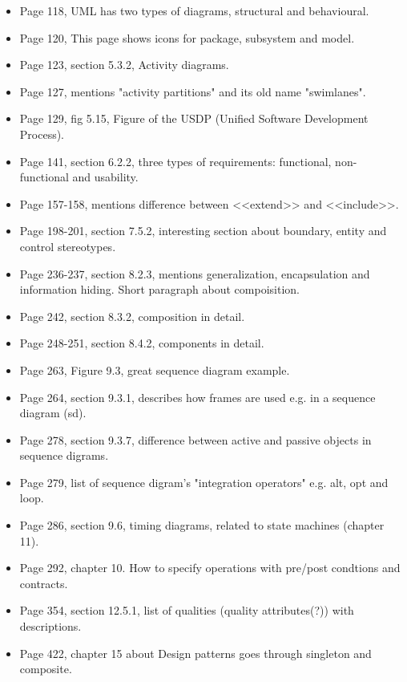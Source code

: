 \begin{itemize}
    \item Page 118, UML has two types of diagrams, structural and behavioural.
    \item Page 120, This page shows icons for package, subsystem and model.
    \item Page 123, section 5.3.2, Activity diagrams.
    \item Page 127, mentions "activity partitions" and its old name
        "swimlanes".
    \item Page 129, fig 5.15, Figure of the USDP (Unified Software Development
        Process).
    \item Page 141, section 6.2.2, three types of requirements: functional,
        non-functional and usability.
    \item Page 157-158, mentions difference between <<extend>> and <<include>>.
    \item Page 198-201, section 7.5.2, interesting section about boundary,
        entity and control stereotypes.
    \item Page 236-237, section 8.2.3, mentions generalization, encapsulation
        and information hiding. Short paragraph about compoisition.
    \item Page 242, section 8.3.2, composition in detail.
    \item Page 248-251, section 8.4.2, components in detail.
    \item Page 263, Figure 9.3, great sequence diagram example.
    \item Page 264, section 9.3.1, describes how frames are used e.g. in a
        sequence diagram (sd).
    \item Page 278, section 9.3.7, difference between active and passive
        objects in sequence digrams.
    \item Page 279, list of sequence digram's "integration operators" e.g. alt,
        opt and loop.
    \item Page 286, section 9.6, timing diagrams, related to state machines
        (chapter 11).
    \item Page 292, chapter 10. How to specify operations with pre/post
        condtions and contracts.
    \item Page 354, section 12.5.1, list of qualities (quality attributes(?))
        with descriptions.
    \item Page 422, chapter 15 about Design patterns goes through singleton and
        composite.
\end{itemize}

